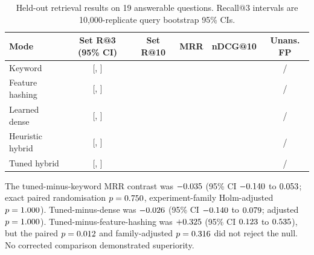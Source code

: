 \begin{table}[htbp]
\centering
\small
\caption{Held-out retrieval results on 19 answerable questions. Recall@3 intervals are 10,000-replicate query bootstrap 95\% CIs.}
\label{tab:retrieval-results}
\begin{tabularx}{\textwidth}{Yccccc}
\toprule
Mode & Set R@3 (95\% CI) & Set R@10 & MRR & nDCG@10 & Unans. FP \\
\midrule
Keyword & \RetrievalKeywordRecallThree{} [\RetrievalKeywordRecallThreeLow{}, \RetrievalKeywordRecallThreeHigh{}] & \RetrievalKeywordRecallTen{} & \RetrievalKeywordMrr{} & \RetrievalKeywordNdcgTen{} & \RetrievalUnanswerableFalsePositiveCount{}/\RetrievalUnanswerableTestCount{} \\
Feature hashing & \RetrievalFeatureHashingRecallThree{} [\RetrievalFeatureHashingRecallThreeLow{}, \RetrievalFeatureHashingRecallThreeHigh{}] & \RetrievalFeatureHashingRecallTen{} & \RetrievalFeatureHashingMrr{} & \RetrievalFeatureHashingNdcgTen{} & \RetrievalUnanswerableFalsePositiveCount{}/\RetrievalUnanswerableTestCount{} \\
Learned dense & \RetrievalDenseRecallThree{} [\RetrievalDenseRecallThreeLow{}, \RetrievalDenseRecallThreeHigh{}] & \RetrievalDenseRecallTen{} & \RetrievalDenseMrr{} & \RetrievalDenseNdcgTen{} & \RetrievalUnanswerableFalsePositiveCount{}/\RetrievalUnanswerableTestCount{} \\
Heuristic hybrid & \RetrievalHeuristicHybridRecallThree{} [\RetrievalHeuristicHybridRecallThreeLow{}, \RetrievalHeuristicHybridRecallThreeHigh{}] & \RetrievalHeuristicHybridRecallTen{} & \RetrievalHeuristicHybridMrr{} & \RetrievalHeuristicHybridNdcgTen{} & \RetrievalUnanswerableFalsePositiveCount{}/\RetrievalUnanswerableTestCount{} \\
Tuned hybrid & \RetrievalTunedHybridRecallThree{} [\RetrievalTunedHybridRecallThreeLow{}, \RetrievalTunedHybridRecallThreeHigh{}] & \RetrievalTunedHybridRecallTen{} & \RetrievalTunedHybridMrr{} & \RetrievalTunedHybridNdcgTen{} & \RetrievalUnanswerableFalsePositiveCount{}/\RetrievalUnanswerableTestCount{} \\
\bottomrule
\end{tabularx}
\end{table}

The tuned-minus-keyword MRR contrast was $-0.035$ (95\% CI $-0.140$ to $0.053$; exact paired randomisation $p=0.750$, experiment-family Holm-adjusted $p=1.000$). Tuned-minus-dense was $-0.026$ (95\% CI $-0.140$ to $0.079$; adjusted $p=1.000$). Tuned-minus-feature-hashing was $+0.325$ (95\% CI $0.123$ to $0.535$), but the paired $p=0.012$ and family-adjusted $p=0.316$ did not reject the null. No corrected comparison demonstrated superiority.

